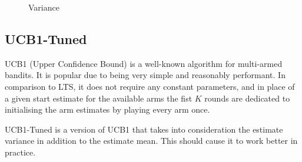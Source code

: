 \begin{figure}[htbp]
    \centering

    
\caption{Variance}
\label{fig:variance}
\end{figure}

\subsection{UCB1-Tuned}
UCB1 \cite{Auer02UCB1} (Upper Confidence Bound) is a well-known algorithm for multi-armed bandits.
It is popular due to being very simple and reasonably performant. In comparison 
to LTS, it does not require any constant parameters, and in place of a given 
start estimate for the available arms the fist $K$ rounds are dedicated to 
initialising the arm estimates by playing every arm once.

UCB1-Tuned is a version of UCB1 that takes into consideration the estimate variance in addition to the estimate mean. This should cause it to work better in practice.

